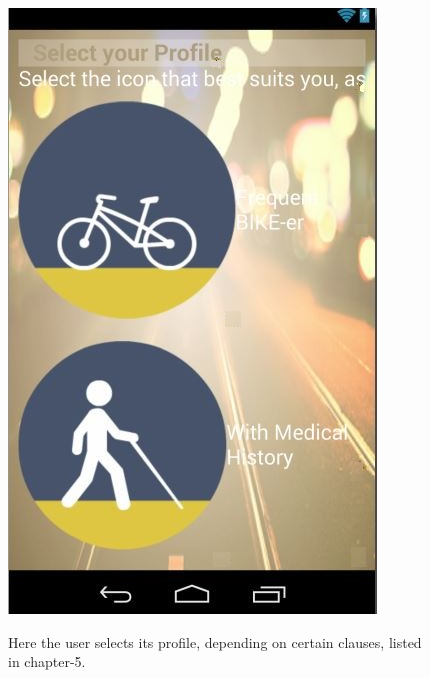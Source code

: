\begin{figure}[h]
	\centering
	\includegraphics[height=0.35\textheight]{fig01/s_profile}
	\label{fig:RHP02}

Here the user selects its profile, depending on certain clauses, listed in chapter-5.

\end{figure}
